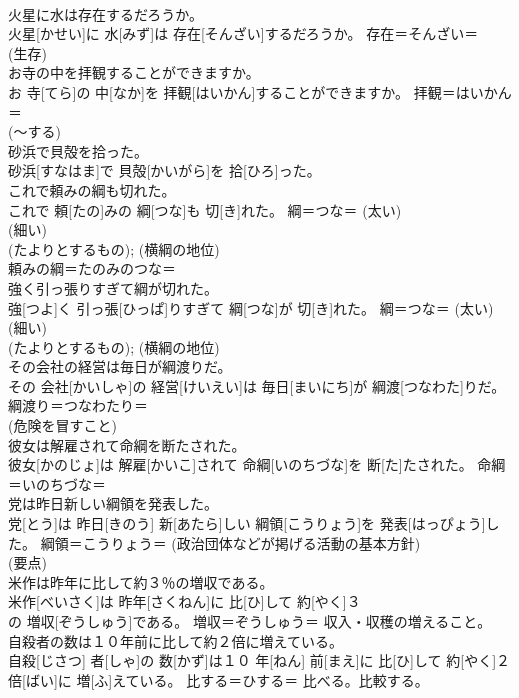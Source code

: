 \documentclass[8pt]{extreport}
\begin{document}
\begin{CJK}{UTF8}{min}
{\\	火星に水は存在するだろうか。	
\\	火星[かせい]に 水[みず]は 存在[そんざい]するだろうか。	存在＝そんざい＝ 
\\	(生存) 
\\	お寺の中を拝観することができますか。	
\\	お 寺[てら]の 中[なか]を 拝観[はいかん]することができますか。	拝観＝はいかん＝ 
\\	(〜する) 
\\	砂浜で貝殻を拾った。	
\\	砂浜[すなはま]で 貝殻[かいがら]を 拾[ひろ]った。	
\\	これで頼みの綱も切れた。	
\\	これで 頼[たの]みの 綱[つな]も 切[き]れた。	綱＝つな＝ (太い) 
\\	(細い) 
\\	(たよりとするもの); (横綱の地位) 
\\	頼みの綱＝たのみのつな＝ 
\\	強く引っ張りすぎて綱が切れた。	
\\	強[つよ]く 引っ張[ひっぱ]りすぎて 綱[つな]が 切[き]れた。	綱＝つな＝ (太い) 
\\	(細い) 
\\	(たよりとするもの); (横綱の地位) 
\\	その会社の経営は毎日が綱渡りだ。	
\\	その 会社[かいしゃ]の 経営[けいえい]は 毎日[まいにち]が 綱渡[つなわた]りだ。	綱渡り＝つなわたり＝ 
\\	(危険を冒すこと) 
\\	彼女は解雇されて命綱を断たされた。	
\\	彼女[かのじょ]は 解雇[かいこ]されて 命綱[いのちづな]を 断[た]たされた。	命綱＝いのちづな＝ 
\\	党は昨日新しい綱領を発表した。	
\\	党[とう]は 昨日[きのう] 新[あたら]しい 綱領[こうりょう]を 発表[はっぴょう]した。	綱領＝こうりょう＝ (政治団体などが掲げる活動の基本方針) 
\\	(要点) 
\\	米作は昨年に比して約３％の増収である。	
\\	米作[べいさく]は 昨年[さくねん]に 比[ひ]して 約[やく]３ 
\\	[ぱーせんと]の 増収[ぞうしゅう]である。	増収＝ぞうしゅう＝ 収入・収穫の増えること。
\\	自殺者の数は１０年前に比して約２倍に増えている。	
\\	自殺[じさつ] 者[しゃ]の 数[かず]は１０ 年[ねん] 前[まえ]に 比[ひ]して 約[やく]２ 倍[ばい]に 増[ふ]えている。	比する＝ひする＝ 比べる。比較する。
}
\end{CJK}
\end{document}
